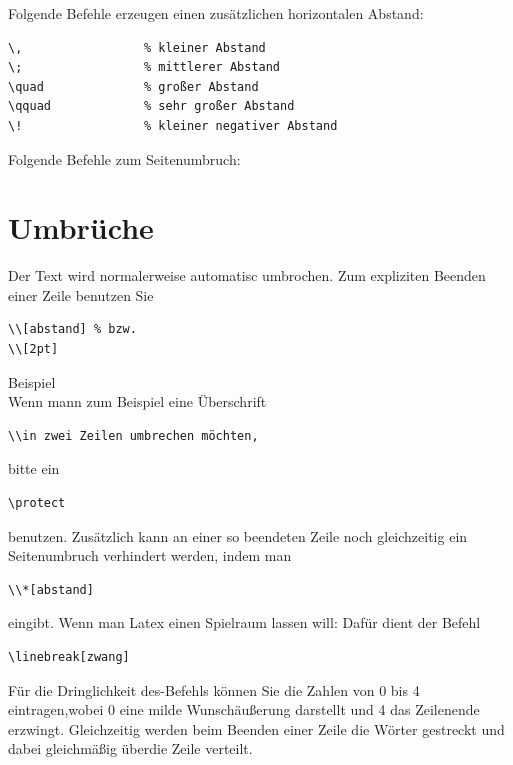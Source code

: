 \documentclass{like}
\begin{document}
Folgende Befehle erzeugen einen zusätzlichen horizontalen Abstand:\nopagebreak\par\medskip\nopagebreak

\qquad\begin{minipage}{0.8\textwidth}
\begin{verbatim}
\,                 % kleiner Abstand
\;                 % mittlerer Abstand
\quad              % großer Abstand
\qquad             % sehr großer Abstand
\!                 % kleiner negativer Abstand
\end{verbatim}
\end{minipage}\par\bigskip


Folgende Befehle zum Seitenumbruch:\nopagebreak\par\medskip\nopagebreak



\section{Umbrüche}
Der Text wird normalerweise automatisc umbrochen. Zum expliziten Beenden einer Zeile benutzen Sie
\begin{verbatim}
\\[abstand] % bzw.
\\[2pt]
\end{verbatim}
Beispiel\\[4pt]
Wenn mann zum Beispiel eine Überschrift
\begin{verbatim}
\\in zwei Zeilen umbrechen möchten,
\end{verbatim}
bitte ein
\begin{verbatim}
\protect
\end{verbatim}
benutzen. Zusätzlich kann an einer so beendeten Zeile noch gleichzeitig ein Seitenumbruch verhindert werden,
indem man
\begin{verbatim}
\\*[abstand]
\end{verbatim}
eingibt.
Wenn man Latex einen Spielraum lassen will: Dafür dient der Befehl
\begin{verbatim}
\linebreak[zwang]
\end{verbatim}

 Für die Dringlichkeit des-Befehls können Sie die Zahlen von 0 bis 4 eintragen,wobei 0 eine milde Wunschäußerung darstellt und 4 das Zeilenende erzwingt. Gleichzeitig werden beim Beenden einer Zeile die Wörter gestreckt und dabei gleichmäßig überdie Zeile verteilt.
\end{document}
